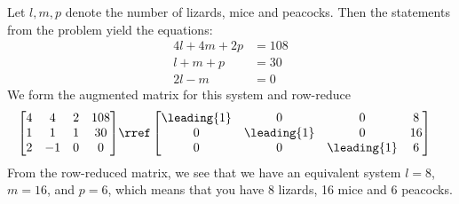 Let $l, m, p$ denote the number of lizards, mice and peacocks.  Then the statements from the problem yield the equations:
%
\begin{align*}
4l+4m+2p&=108\\
l+m+p &= 30\\
2l-m&=0
\end{align*}
%
We form the augmented matrix for this system and row-reduce
%
\begin{align*}
\begin{bmatrix}
4 & 4 & 2 & 108\\
1 & 1 & 1 & 30\\
2 & -1 & 0 & 0
\end{bmatrix}
&\rref
\begin{bmatrix}
\leading{1} & 0 & 0 &  8\\
0 & \leading{1} & 0 &  16\\
0 & 0 & \leading{1} &  6
\end{bmatrix}
\end{align*}
%
From the row-reduced matrix, we see that we have an equivalent system $l=8$, $m=16$, and $p=6$, which means that you have 8 lizards, 16 mice and 6 peacocks.
